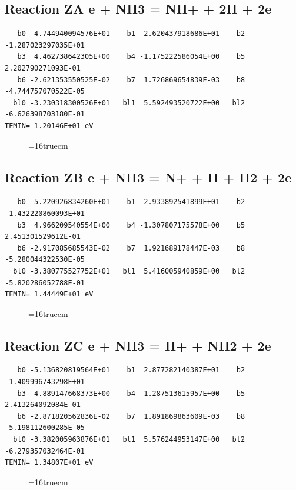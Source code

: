 \documentclass[12pt,dvipdfm]{article}
\begin{document}
\subsection{
Reaction ZA e + NH3 = NH+ + 2H + 2e}
\begin{small}\begin{verbatim}
   b0 -4.744940094576E+01    b1  2.620437918686E+01    b2 -1.287023297035E+01
   b3  4.462738642305E+00    b4 -1.175222586054E+00    b5  2.202790271093E-01
   b6 -2.621353550525E-02    b7  1.726869654839E-03    b8 -4.744757070522E-05
  bl0 -3.230318300526E+01   bl1  5.592493520722E+00   bl2 -6.626398703180E-01
TEMIN= 1.20146E+01 eV
   \end{verbatim}\end{small}
\begin{figure}[h!]
\label{n2rates}
\epsfxsize=16truecm
\end{figure}
\newpage

\subsection{
Reaction ZB e + NH3 = N+ + H + H2 + 2e}
\begin{small}\begin{verbatim}
   b0 -5.220926834260E+01    b1  2.933892541899E+01    b2 -1.432220860093E+01
   b3  4.966209540554E+00    b4 -1.307807175578E+00    b5  2.451301529612E-01
   b6 -2.917085685543E-02    b7  1.921689178447E-03    b8 -5.280044322530E-05
  bl0 -3.380775527752E+01   bl1  5.416005940859E+00   bl2 -5.820286052788E-01
TEMIN= 1.44449E+01 eV
   \end{verbatim}\end{small}
\begin{figure}[h!]
\label{n2rates}
\epsfxsize=16truecm
\end{figure}
\newpage

\subsection{
Reaction ZC e + NH3 = H+ + NH2 + 2e}
\begin{small}\begin{verbatim}
   b0 -5.136820819564E+01    b1  2.877282140387E+01    b2 -1.409996743298E+01
   b3  4.889147668373E+00    b4 -1.287513615957E+00    b5  2.413264092084E-01
   b6 -2.871820562836E-02    b7  1.891869863609E-03    b8 -5.198112600285E-05
  bl0 -3.382005963876E+01   bl1  5.576244953147E+00   bl2 -6.279357032464E-01
TEMIN= 1.34807E+01 eV
   \end{verbatim}\end{small}
\begin{figure}[h!]
\label{n2rates}
\epsfxsize=16truecm
\end{figure}
\newpage
\end{document}
